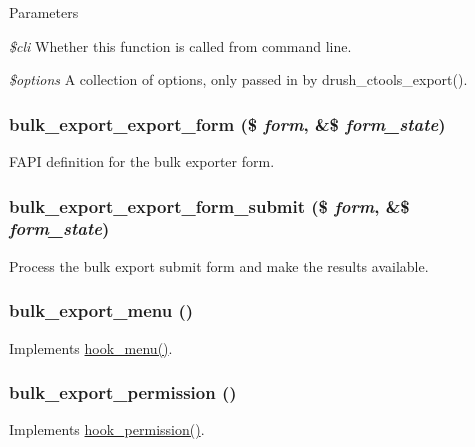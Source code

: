 \begin{DoxyParams}{Parameters}
\item[{\em \$cli}]Whether this function is called from command line. \item[{\em \$options}]A collection of options, only passed in by drush\_\-ctools\_\-export(). \end{DoxyParams}
\hypertarget{bulk__export_8module_a8fbb895533c1a775e9c40a8dd335113c}{
\subsubsection[{bulk\_\-export\_\-export\_\-form}]{\setlength{\rightskip}{0pt plus 5cm}bulk\_\-export\_\-export\_\-form (\$ {\em form}, \/  \&\$ {\em form\_\-state})}}
\label{bulk__export_8module_a8fbb895533c1a775e9c40a8dd335113c}
FAPI definition for the bulk exporter form. \hypertarget{bulk__export_8module_a5737240f3ea826550894b474535c67a0}{
\subsubsection[{bulk\_\-export\_\-export\_\-form\_\-submit}]{\setlength{\rightskip}{0pt plus 5cm}bulk\_\-export\_\-export\_\-form\_\-submit (\$ {\em form}, \/  \&\$ {\em form\_\-state})}}
\label{bulk__export_8module_a5737240f3ea826550894b474535c67a0}
Process the bulk export submit form and make the results available. \hypertarget{bulk__export_8module_a7e9e45b8daed844ca0371fde54fa64d8}{
\subsubsection[{bulk\_\-export\_\-menu}]{\setlength{\rightskip}{0pt plus 5cm}bulk\_\-export\_\-menu ()}}
\label{bulk__export_8module_a7e9e45b8daed844ca0371fde54fa64d8}
Implements \hyperlink{group__hooks_ga5c95244fea59b25666e409759e133ded}{hook\_\-menu()}. \hypertarget{bulk__export_8module_a2a73fe75148a7d87b162a95e6ece51fe}{
\subsubsection[{bulk\_\-export\_\-permission}]{\setlength{\rightskip}{0pt plus 5cm}bulk\_\-export\_\-permission ()}}
\label{bulk__export_8module_a2a73fe75148a7d87b162a95e6ece51fe}
Implements \hyperlink{group__hooks_ga2b22b45f4925f2478412477bae329713}{hook\_\-permission()}. 